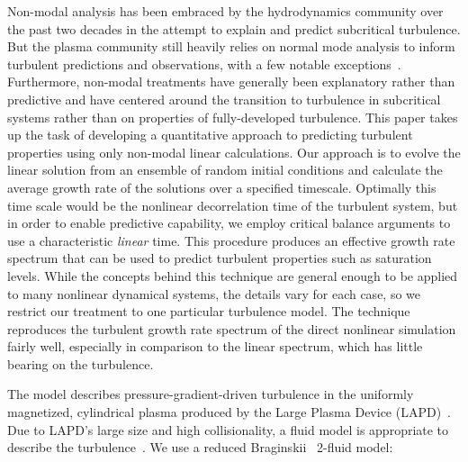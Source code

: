 \documentclass[letter,scriptaddress,twocolumn, prl,showkeys]{revtex4}
\begin{document}
Non-modal analysis has been embraced by the hydrodynamics community over the past two decades in the attempt to explain and predict subcritical turbulence. But the plasma community
still heavily relies on normal mode analysis to inform turbulent predictions and observations, with a few notable exceptions~\cite{camargo1998,camporeale2010,schekochihin2012}. 
Furthermore, non-modal treatments have generally been explanatory rather than predictive and have centered around the transition to turbulence in subcritical systems rather 
than on properties of fully-developed turbulence.
This paper takes up the task of developing a quantitative approach to predicting turbulent properties using only non-modal linear calculations. 
Our approach is to evolve the linear solution from an ensemble of random initial conditions 
and calculate the average growth rate of the solutions over a specified timescale.  Optimally this time scale would be the
nonlinear decorrelation time of the turbulent system, but in order to enable predictive capability, we employ critical balance
arguments to use a characteristic \emph{linear} time.
This procedure produces an effective growth rate spectrum that can be used to predict turbulent properties such as saturation levels.
While the concepts behind this technique are general enough to be applied to many nonlinear dynamical systems, the details vary for each case, 
so we restrict our treatment to one particular turbulence model. The technique reproduces the turbulent growth rate spectrum of the direct nonlinear simulation fairly well, especially
in comparison to the linear spectrum, which has little bearing on the turbulence.

The model describes pressure-gradient-driven turbulence in the uniformly magnetized, cylindrical plasma
produced by the Large Plasma Device (LAPD)~\cite{gekelman1991}. 
Due to LAPD's large size and high collisionality, a fluid model is
appropriate to describe the turbulence~\cite{Popovich2010a,Popovich2010b,Umansky2011}. We use a reduced Braginskii~\cite{Braginskii1965} 2-fluid model:
\end{document}
